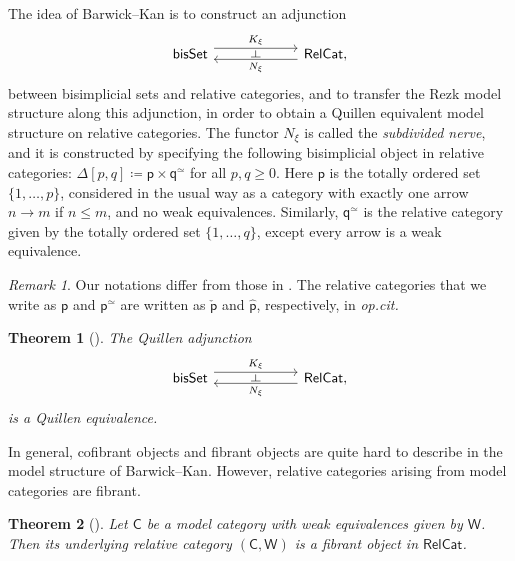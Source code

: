 \documentclass{proc-l}
\theoremstyle{plain}
\newtheorem{theorem}{Theorem}[section]
\theoremstyle{definition}
\theoremstyle{remark}
\newtheorem{remark}[{theorem}]{Remark}
\begin{document}
The idea of Barwick--Kan is to construct an adjunction
\[
\begin{tikzcd}[column sep=5pc,row sep=3pc]
\mathsf{bisSet} \arrow[r, shift left=1.1ex, "K_{\xi}"{name=F}] & \mathsf{RelCat} , \arrow[l, shift left=.75ex, "N_{\xi}"{name=U}]
\arrow[phantom, from=F, to=U, , "\dashv" rotate=-90]
\end{tikzcd}
\]
between bisimplicial sets and relative categories, and to transfer the Rezk model structure along this adjunction, in order to obtain a Quillen equivalent model structure on relative categories. The functor $N_{\xi}$ is called the\textit{ subdivided nerve}, and it is constructed by specifying the following bisimplicial object in relative categories: $\Delta[p,q] \coloneqq \mathsf{p}\times\mathsf{q}^{\simeq}$ for all $p,q \geq 0$. Here $\mathsf{p}$ is the totally ordered set $\{1,\dots, p\}$, considered in the usual way as a category with exactly one arrow $n \longrightarrow m$ if $n \leq m$, and no weak equivalences. Similarly, $\mathsf{q}^{\simeq}$ is the relative category given by the totally ordered set $\{1,\dots, q\}$, except every arrow is a weak equivalence.

\begin{remark}%
\label{Remark:A.2}Our notations differ from those in \cite{BarwickKan1}. The relative categories that we write as $\mathsf{p}$ and $\mathsf{p}^\simeq$ are written as $\check{\mathsf{p}}$ and $\hat{\mathsf{p}}$, respectively, in \textit{op.cit.}
\end{remark}

\begin{theorem}[{\cite{BarwickKan1}}]%
\label{Theorem:A.3}
The Quillen adjunction
\[
\begin{tikzcd}[column sep=5pc,row sep=3pc]
\mathsf{bisSet} \arrow[r, shift left=1.1ex, "K_{\xi}"{name=F}] & \mathsf{RelCat} , \arrow[l, shift left=.75ex, "N_{\xi}"{name=U}]
\arrow[phantom, from=F, to=U, , "\dashv" rotate=-90]
\end{tikzcd}
\]
is a Quillen equivalence.
\end{theorem}

In general, cofibrant objects and fibrant objects are quite hard to describe in the model structure of Barwick--Kan. However, relative categories arising from model categories are fibrant.

\begin{theorem}[{\cite[Main Theorem]{Meier16}}]%
\label{Theorem:A.4}
Let $\mathsf{C}$ be a model category with weak equivalences given by $\mathsf{W}$. Then its underlying relative category $(\mathsf{C},\mathsf{W})$ is a fibrant object in $\mathsf{RelCat}$.
\end{theorem}
\end{document}
